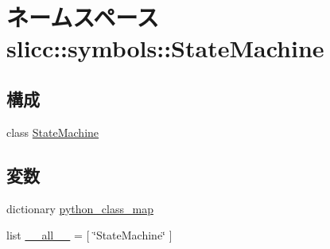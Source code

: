 \hypertarget{namespaceslicc_1_1symbols_1_1StateMachine}{
\section{ネームスペース slicc::symbols::StateMachine}
\label{namespaceslicc_1_1symbols_1_1StateMachine}
}
\subsection*{構成}
\begin{DoxyCompactItemize}
\item 
class \hyperlink{classslicc_1_1symbols_1_1StateMachine_1_1StateMachine}{StateMachine}
\end{DoxyCompactItemize}
\subsection*{変数}
\begin{DoxyCompactItemize}
\item 
dictionary \hyperlink{namespaceslicc_1_1symbols_1_1StateMachine_a243d8449d9b3ab1e85f865bc15d42ad7}{python\_\-class\_\-map}
\item 
list \hyperlink{namespaceslicc_1_1symbols_1_1StateMachine_aa4a022e6ddacd362b83964da5cc5d044}{\_\-\_\-all\_\-\_\-} = \mbox{[} \char`\"{}StateMachine\char`\"{} \mbox{]}
\end{DoxyCompactItemize}


